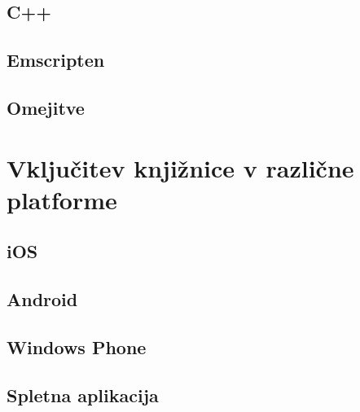 \section{C++}

\section{Emscripten}

\section{Omejitve}

\chapter{Vključitev knjižnice v različne platforme}
\label{chap:cross-platform}

\section{iOS}

\section{Android}

\section{Windows Phone}

\section{Spletna aplikacija}
